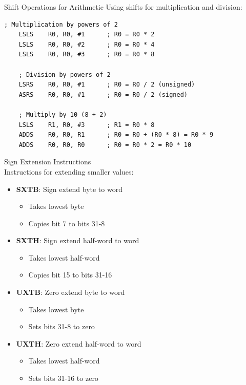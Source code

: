 \begin{example2}{Shift Operations for Arithmetic}
Using shifts for multiplication and division:
\begin{lstlisting}[language=armasm, style=basesmol]
    ; Multiplication by powers of 2
    LSLS    R0, R0, #1      ; R0 = R0 * 2
    LSLS    R0, R0, #2      ; R0 = R0 * 4
    LSLS    R0, R0, #3      ; R0 = R0 * 8
    
    ; Division by powers of 2
    LSRS    R0, R0, #1      ; R0 = R0 / 2 (unsigned)
    ASRS    R0, R0, #1      ; R0 = R0 / 2 (signed)
    
    ; Multiply by 10 (8 + 2)
    LSLS    R1, R0, #3      ; R1 = R0 * 8
    ADDS    R0, R0, R1      ; R0 = R0 + (R0 * 8) = R0 * 9
    ADDS    R0, R0, R0      ; R0 = R0 * 2 = R0 * 10
\end{lstlisting}
\end{example2}

\begin{concept}{Sign Extension Instructions}\\
Instructions for extending smaller values:
\begin{itemize}
  \item \textbf{SXTB}: Sign extend byte to word
    \begin{itemize}
      \item Takes lowest byte
      \item Copies bit 7 to bits 31-8
    \end{itemize}
  \item \textbf{SXTH}: Sign extend half-word to word
    \begin{itemize}
      \item Takes lowest half-word
      \item Copies bit 15 to bits 31-16
    \end{itemize}
  \item \textbf{UXTB}: Zero extend byte to word
    \begin{itemize}
      \item Takes lowest byte
      \item Sets bits 31-8 to zero
    \end{itemize}
  \item \textbf{UXTH}: Zero extend half-word to word
    \begin{itemize}
      \item Takes lowest half-word
      \item Sets bits 31-16 to zero
    \end{itemize}
\end{itemize}
\end{concept}

